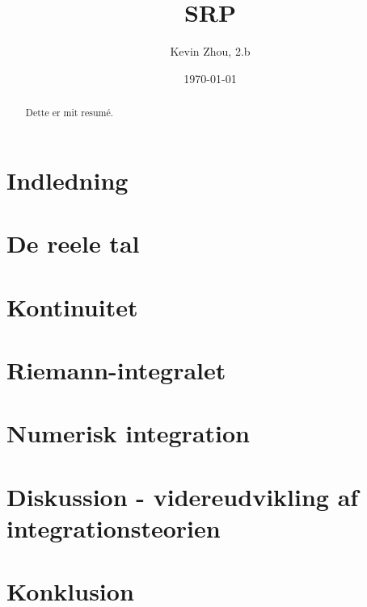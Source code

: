 \documentclass{article}
\title{SRP}
\author{Kevin Zhou, 2.b}
\date{\today}
\begin{document}

\begin{abstract}
  Dette er mit resumé.
\end{abstract}

\tableofcontents
\thispagestyle{empty}
\newpage
{}
\section{Indledning}
  \label{sec:Indledning}

\section{De reele tal}%
\label{sec:De reele tal}


\section{Kontinuitet}%
\label{sec:Kontinuitet}


\section{Riemann-integralet}%
\label{sec:Riemann-integralet}


\section{Numerisk integration}%
\label{sec:Numerisk integration}

\section{Diskussion - videreudvikling af integrationsteorien}%
\label{sec:Diskussion}

\section{Konklusion}%
\label{sec:Konklusion}



\newpage
\singlespacing %
\setlength{\bibsep}{5pt} %
\thispagestyle{empty} %
\end{document}
